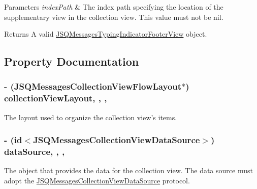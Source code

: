 \begin{DoxyParams}{Parameters}
{\em index\+Path} & The index path specifying the location of the supplementary view in the collection view. This value must not be {\ttfamily nil}.\\
\hline
\end{DoxyParams}
\begin{DoxyReturn}{Returns}
A valid {\ttfamily \hyperlink{interface_j_s_q_messages_typing_indicator_footer_view}{J\+S\+Q\+Messages\+Typing\+Indicator\+Footer\+View}} object. 
\end{DoxyReturn}


\subsection{Property Documentation}
\hypertarget{interface_j_s_q_messages_collection_view_a5f685c56a4ef349a6ad8fa04f8915c64}{}
\subsubsection[{collection\+View\+Layout}]{\setlength{\rightskip}{0pt plus 5cm}-\/ ({\bf J\+S\+Q\+Messages\+Collection\+View\+Flow\+Layout}$\ast$) collection\+View\+Layout\hspace{0.3cm}{\ttfamily [read]}, {\ttfamily [write]}, {\ttfamily [nonatomic]}, {\ttfamily [strong]}}\label{interface_j_s_q_messages_collection_view_a5f685c56a4ef349a6ad8fa04f8915c64}
The layout used to organize the collection view’s items. \hypertarget{interface_j_s_q_messages_collection_view_ab2d7a72bc1b6d267cd69e615c4965c2a}{}
\subsubsection[{data\+Source}]{\setlength{\rightskip}{0pt plus 5cm}-\/ (id$<${\bf J\+S\+Q\+Messages\+Collection\+View\+Data\+Source}$>$) data\+Source\hspace{0.3cm}{\ttfamily [read]}, {\ttfamily [write]}, {\ttfamily [nonatomic]}, {\ttfamily [weak]}}\label{interface_j_s_q_messages_collection_view_ab2d7a72bc1b6d267cd69e615c4965c2a}
The object that provides the data for the collection view. The data source must adopt the {\ttfamily \hyperlink{protocol_j_s_q_messages_collection_view_data_source-p}{J\+S\+Q\+Messages\+Collection\+View\+Data\+Source}} protocol. \hypertarget{interface_j_s_q_messages_collection_view_ac00c8069a3335df10da0bf609b27ef74}{}
